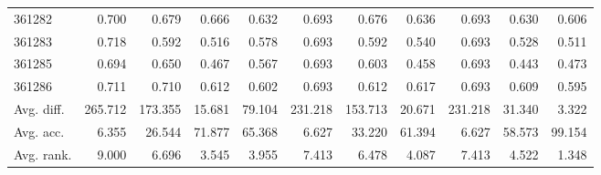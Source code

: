 \begin{tabular}{lrrrrrrrrrr}
361282 & 0.700 & 0.679 & 0.666 & 0.632 & 0.693 & 0.676 & 0.636 & 0.693 & 0.630 & 0.606 \\
361283 & 0.718 & 0.592 & 0.516 & 0.578 & 0.693 & 0.592 & 0.540 & 0.693 & 0.528 & 0.511 \\
361285 & 0.694 & 0.650 & 0.467 & 0.567 & 0.693 & 0.603 & 0.458 & 0.693 & 0.443 & 0.473 \\
361286 & 0.711 & 0.710 & 0.612 & 0.602 & 0.693 & 0.612 & 0.617 & 0.693 & 0.609 & 0.595 \\
Avg. diff. & 265.712 & 173.355 & 15.681 & 79.104 & 231.218 & 153.713 & 20.671 & 231.218 & 31.340 & 3.322 \\
Avg. acc. & 6.355 & 26.544 & 71.877 & 65.368 & 6.627 & 33.220 & 61.394 & 6.627 & 58.573 & 99.154 \\
Avg. rank. & 9.000 & 6.696 & 3.545 & 3.955 & 7.413 & 6.478 & 4.087 & 7.413 & 4.522 & 1.348 \\
\bottomrule
\end{tabular}
